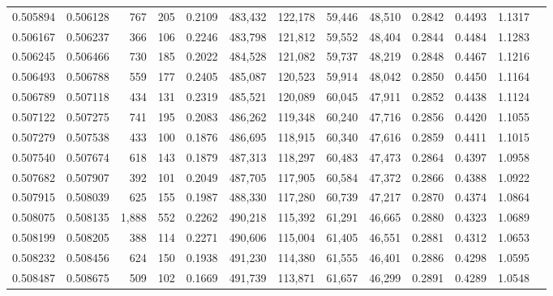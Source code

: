 \begin{tabular}{rrrrrrrrrrrrr}
0.505894 & 0.506128 &   767 &   205 &                                     0.2109 & 483,432 & 122,178 &  59,446 &  48,510 & 0.2842 & 0.4493 & 1.1317 \\
0.506167 & 0.506237 &   366 &   106 &                                     0.2246 & 483,798 & 121,812 &  59,552 &  48,404 & 0.2844 & 0.4484 & 1.1283 \\
0.506245 & 0.506466 &   730 &   185 &                                     0.2022 & 484,528 & 121,082 &  59,737 &  48,219 & 0.2848 & 0.4467 & 1.1216 \\
0.506493 & 0.506788 &   559 &   177 &                                     0.2405 & 485,087 & 120,523 &  59,914 &  48,042 & 0.2850 & 0.4450 & 1.1164 \\
0.506789 & 0.507118 &   434 &   131 &                                     0.2319 & 485,521 & 120,089 &  60,045 &  47,911 & 0.2852 & 0.4438 & 1.1124 \\
0.507122 & 0.507275 &   741 &   195 &                                     0.2083 & 486,262 & 119,348 &  60,240 &  47,716 & 0.2856 & 0.4420 & 1.1055 \\
0.507279 & 0.507538 &   433 &   100 &                                     0.1876 & 486,695 & 118,915 &  60,340 &  47,616 & 0.2859 & 0.4411 & 1.1015 \\
0.507540 & 0.507674 &   618 &   143 &                                     0.1879 & 487,313 & 118,297 &  60,483 &  47,473 & 0.2864 & 0.4397 & 1.0958 \\
0.507682 & 0.507907 &   392 &   101 &                                     0.2049 & 487,705 & 117,905 &  60,584 &  47,372 & 0.2866 & 0.4388 & 1.0922 \\
0.507915 & 0.508039 &   625 &   155 &                                     0.1987 & 488,330 & 117,280 &  60,739 &  47,217 & 0.2870 & 0.4374 & 1.0864 \\
0.508075 & 0.508135 & 1,888 &   552 &                                     0.2262 & 490,218 & 115,392 &  61,291 &  46,665 & 0.2880 & 0.4323 & 1.0689 \\
0.508199 & 0.508205 &   388 &   114 &                                     0.2271 & 490,606 & 115,004 &  61,405 &  46,551 & 0.2881 & 0.4312 & 1.0653 \\
0.508232 & 0.508456 &   624 &   150 &                                     0.1938 & 491,230 & 114,380 &  61,555 &  46,401 & 0.2886 & 0.4298 & 1.0595 \\
0.508487 & 0.508675 &   509 &   102 &                                     0.1669 & 491,739 & 113,871 &  61,657 &  46,299 & 0.2891 & 0.4289 & 1.0548 \\

\end{tabular}
